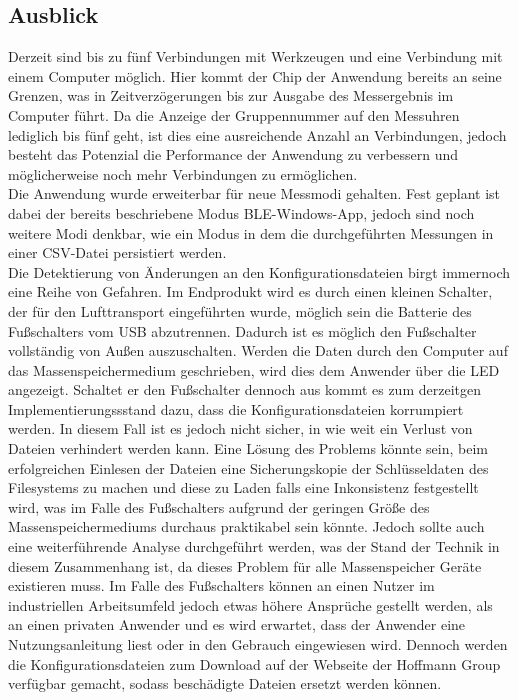 \subsection{Ausblick}
Derzeit sind bis zu fünf Verbindungen mit Werkzeugen und eine Verbindung mit einem Computer möglich. Hier kommt der Chip der Anwendung bereits an seine Grenzen, was in Zeitverzögerungen bis zur Ausgabe des Messergebnis im Computer führt. Da die Anzeige der Gruppennummer auf den Messuhren lediglich bis fünf geht, ist dies eine ausreichende Anzahl an Verbindungen, jedoch besteht das Potenzial die Performance der Anwendung zu verbessern und möglicherweise noch mehr Verbindungen zu ermöglichen.\\
Die Anwendung wurde erweiterbar für neue Messmodi gehalten. Fest geplant ist dabei der bereits beschriebene Modus \ac{BLE}-Windows-App, jedoch sind noch weitere Modi denkbar, wie ein Modus in dem die durchgeführten Messungen in einer \ac{CSV}-Datei persistiert werden.\\
Die Detektierung von Änderungen an den Konfigurationsdateien birgt immernoch eine Reihe von Gefahren. Im Endprodukt wird es durch einen kleinen Schalter, der für den Lufttransport eingeführten wurde, möglich sein die Batterie des Fußschalters vom USB abzutrennen. Dadurch ist es möglich den Fußschalter vollständig von Außen auszuschalten. Werden die Daten durch den Computer auf das Massenspeichermedium geschrieben, wird dies dem Anwender über die LED angezeigt. Schaltet er den Fußschalter dennoch aus kommt es zum derzeitgen Implementierungssstand dazu, dass die Konfigurationsdateien korrumpiert werden. In diesem Fall ist es jedoch nicht sicher, in wie weit ein Verlust von Dateien verhindert werden kann. Eine Lösung des Problems könnte sein, beim erfolgreichen Einlesen der Dateien eine Sicherungskopie der Schlüsseldaten des Filesystems zu machen und diese zu Laden falls eine Inkonsistenz festgestellt wird, was im Falle des Fußschalters aufgrund der geringen Größe des Massenspeichermediums durchaus praktikabel sein könnte. Jedoch sollte auch eine weiterführende Analyse durchgeführt werden, was der Stand der Technik in diesem Zusammenhang ist, da dieses Problem für alle Massenspeicher Geräte existieren muss. Im Falle des Fußschalters können an einen Nutzer im industriellen Arbeitsumfeld jedoch etwas höhere Ansprüche gestellt werden, als an einen privaten Anwender und es wird erwartet, dass der Anwender eine Nutzungsanleitung liest oder in den Gebrauch eingewiesen wird. Dennoch werden die Konfigurationsdateien zum Download auf der Webseite der Hoffmann Group verfügbar gemacht, sodass beschädigte Dateien ersetzt werden können.\\
